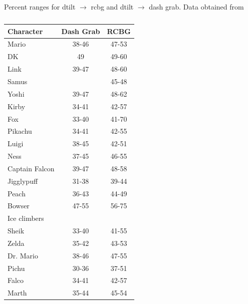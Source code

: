 \begin{table}[h]
    \centering
    \caption{Percent ranges for dtilt $\rightarrow$ rcbg and dtilt $\rightarrow$ dash grab. Data obtained from\cite{ref:jason:rcbg-ranges}}
    \begin{subtable}[t]{.45\linewidth}
        \centering
        \caption{}
        \begin{tabular}{lcc}
            \toprule
            \textbf{Character} & \textbf{Dash Grab} & \textbf{RCBG} \\
            \midrule
            Mario             & 38-46          & 47-53 \\
            DK                & 49             & 49-60 \\
            Link              & 39-47          & 48-60 \\
            Samus             &                & 45-48 \\
            Yoshi             & 39-47          & 48-62 \\
            Kirby             & 34-41\tnote{1} & 42-57 \\
            Fox               & 33-40\tnote{1} & 41-70 \\
            Pikachu           & 34-41\tnote{1} & 42-55 \\
            Luigi             & 38-45\tnote{2} & 42-51\tnote{3} \\
            Ness              & 37-45          & 46-55 \\
            Captain Falcon    & 39-47          & 48-58 \\
            Jigglypuff        & 31-38\tnote{1} & 39-44 \\
            Peach             & 36-43\tnote{1} & 44-49 \\
            Bowser            & 47-55          & 56-75 \\
            Ice climbers      &                &       \\
            Sheik             & 33-40\tnote{1} & 41-55 \\
            Zelda             & 35-42          & 43-53 \\
            Dr. Mario         & 38-46\tnote{1} & 47-55 \\
            Pichu             & 30-36\tnote{1} & 37-51 \\
            Falco             & 34-41\tnote{1} & 42-57 \\
            Marth             & 35-44          & 45-54 \\

\end{tabular}
\end{subtable}
\end{table}
